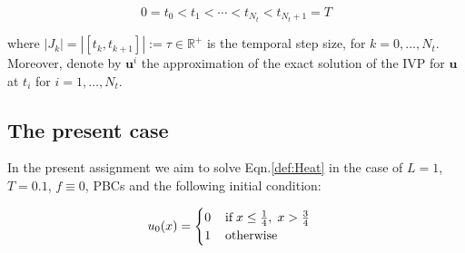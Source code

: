 \documentclass[11pt]{article}
\theoremstyle{theorem}
\theoremstyle{definition}
\begin{document}
$$0 = t_0 < t_1 < \cdots < t_{N_t} < t_{N_t + 1} = T$$

where $|J_k| = | [t_{k},t_{k+1}] | := \tau\in\mathbb{R}^+$ is the temporal step size, for $ k = 0,\ldots,N_t $. Moreover, denote by $ \mathbf{u}^{i} $ the approximation of the exact solution of the IVP for $ \mathbf{u} $ at $ t_i $ for $ i = 1,\ldots,N_t $.

\subsection{The present case}
In the present assignment we aim to solve Eqn.\eqref{def:Heat} in the case of $L=1$, $T=0.1$, $f\equiv 0$, PBCs and the following initial condition:

\begin{align}
\label{eqn:init-cond}
u_0(x)=
\begin{cases}
0\hspace{4mm}\text{if}\hspace{1mm} x\le\frac{1}{4},\hspace{1mm}x>\frac{3}{4}\\
1\hspace{4mm}\text{otherwise}
\end{cases}
\end{align}
\end{document}
